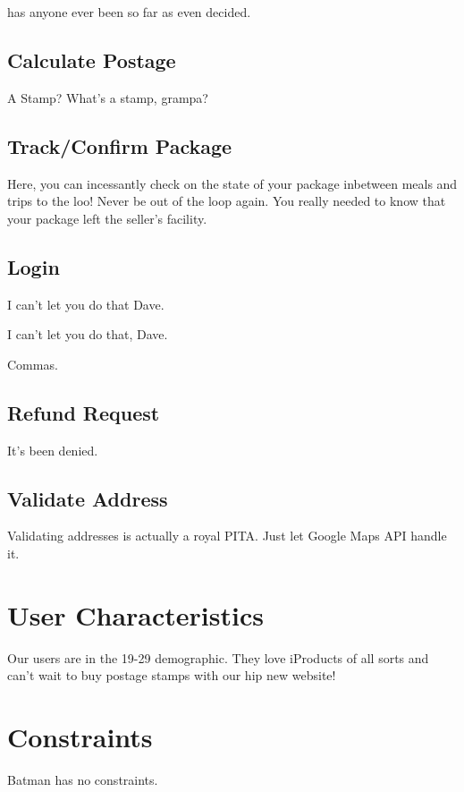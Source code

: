 \documentclass{scrreprt}
\begin{document}
has anyone ever been so far as even decided.

\subsection{Calculate Postage}

A Stamp? What's a stamp, grampa?

\subsection{Track/Confirm Package}

Here, you can incessantly check on the state of your package inbetween meals 
and trips to the loo! Never be out of the loop again. You really needed to 
know that your package left the seller's facility.

\subsection{Login}

I can't let you do that Dave.

I can't let you do that, Dave.

Commas.

\subsection{Refund Request}

It's been denied.

\subsection{Validate Address}

Validating addresses is actually a royal PITA. Just let Google Maps API 
handle it.

\section{User Characteristics}

Our users are in the 19-29 demographic. They love iProducts of all sorts and 
can't wait to buy postage stamps with our hip new website!

\section{Constraints}

Batman has no constraints.
\end{document}
